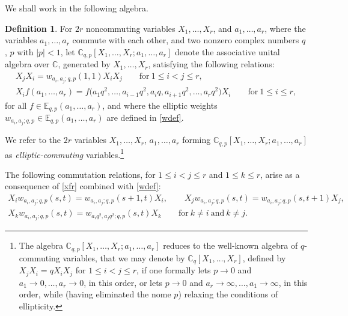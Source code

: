 \documentclass[pdftex]{sigma}
\numberwithin{equation}{section}
\theoremstyle{definition}
\newtheorem{Definition}[Theorem]{Definition}
\newcommand{\C}{\mathbb C}
\newcommand{\E}{\mathbb E}
\begin{document}
We shall work in the following algebra.
\begin{Definition}\label{defear}
For $2r$ noncommuting variables $X_1,\dots,X_r$, and $a_1,\dots,a_r$,
where the variables $a_1,\dots,a_r$ commute with each other,
and two nonzero complex numbers $q$, $p$ with $|p|<1$, let $\C_{q,p}[X_1,\dots,X_r;a_1,\dots,a_r]$
denote the associative
unital algebra over $\C$, generated by $X_1,{\dots},X_r$,
satisfying the following relations:
\begin{subequations}\label{defeaeqr}
\begin{gather}
X_jX_i=w_{a_i,a_j;q,p}(1,1) X_iX_j
\qquad\text{for}\ 1\le i<j\le r,\label{elleqr}\\
X_i f(a_1,\dots,a_r)=f\bigl(a_1q^2,\dots,a_{i-1}q^2,a_iq,
a_{i+1}q^2,\dots,a_r q^2\bigr) X_i\qquad\text{for}\ 1\le i\le r,\label{xfr}
\end{gather}
\end{subequations}
for all $f\in\E_{q,p}(a_1,\dots,a_r)$,
and where the elliptic weights
$w_{a_i,a_j;q,p}\in\E_{q,p}(a_1,\dots,a_r)$
are defined in \eqref{wdef}.
\end{Definition}
We refer to the $2r$ variables $X_1,\dots,X_r$, $a_1,\dots,a_r$
forming $\C_{q,p}[X_1,\dots,X_r;a_1,\dots,a_r]$
as {\em elliptic-commuting} variables.\footnote{The algebra
 $\C_{q,p}[X_1,\dots,X_r;a_1,\dots,a_r]$
reduces to the well-known algebra of $q$-commuting
variables, that we may denote by $\C_q[X_1,\dots,X_r]$,
defined by $X_jX_i=qX_iX_j$ for $1\le i<j\le r$,
if one formally lets $p\to 0$ and~${a_1\to 0,\dots,a_r\to 0}$,
in this order, or lets $p\to 0$ and $a_r\to\infty,\dots,a_1\to\infty$,
in this order, while (having eliminated the nome $p$) relaxing the
conditions of ellipticity.}

The following commutation relations, for $1\le i<j\le r$
and $1\le k\le r$, arise as a consequence of
\eqref{xfr} combined with \eqref{wdef}:
\begin{gather*}
 X_i w_{a_i,a_j;q,p}(s,t)=w_{a_i,a_j;q,p}(s+1,t) X_i,\qquad
 X_j w_{a_i,a_j;q,p}(s,t)=w_{a_i,a_j;q,p}(s,t+1) X_j,\\
 X_k w_{a_i,a_j;q,p}(s,t)=w_{a_iq^2,a_jq^2;q,p}(s,t) X_k
 \qquad\text{for}\ k\neq i\ \text{and}\ k\neq j.
\end{gather*}
\end{document}
